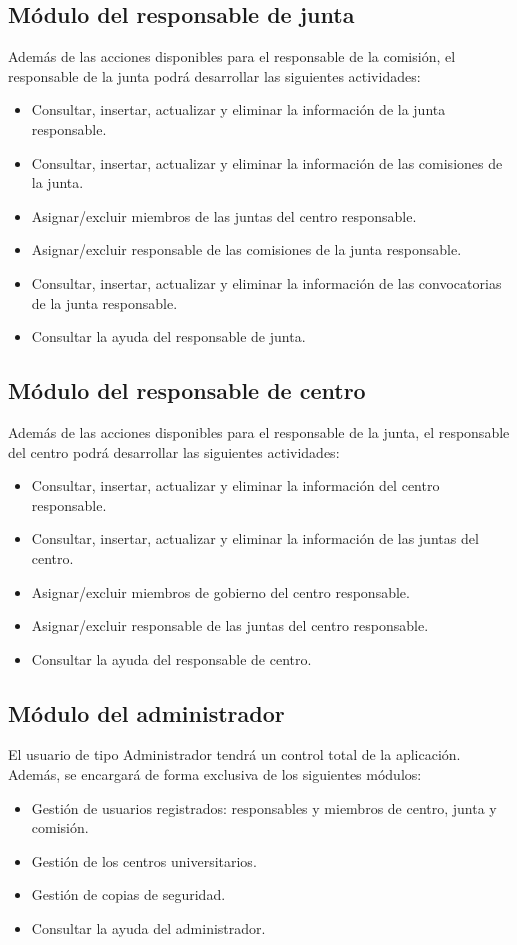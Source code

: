 \subsection{Módulo del responsable de junta}
Además de las acciones disponibles para el responsable de la comisión, el responsable de la junta podrá desarrollar las siguientes actividades:
\begin{itemize}
    \item Consultar, insertar, actualizar y eliminar la información de la junta responsable.
    \item Consultar, insertar, actualizar y eliminar la información de las comisiones de la junta.
    \item Asignar/excluir miembros de las juntas del centro responsable.
    \item Asignar/excluir responsable de las comisiones de la junta responsable.
    \item Consultar, insertar, actualizar y eliminar la información de las convocatorias de la junta responsable.
    \item Consultar la ayuda del responsable de junta.
\end{itemize}

\subsection{Módulo del responsable de centro}
Además de las acciones disponibles para el responsable de la junta, el responsable del centro podrá desarrollar las siguientes actividades:
\begin{itemize}
    \item Consultar, insertar, actualizar y eliminar la información del centro responsable.
    \item Consultar, insertar, actualizar y eliminar la información de las juntas del centro.
    \item Asignar/excluir miembros de gobierno del centro responsable.
    \item Asignar/excluir responsable de las juntas del centro responsable.
\item Consultar la ayuda del responsable de centro.
\end{itemize}

\subsection{Módulo del administrador}

El usuario de tipo Administrador tendrá un control total de la aplicación. Además, se encargará de forma exclusiva de los siguientes módulos:
\begin{itemize}
    \item Gestión de usuarios registrados: responsables y miembros de centro, junta y comisión.
    \item Gestión de los centros universitarios.
    \item Gestión de copias de seguridad.
    \item Consultar la ayuda del administrador.
\end{itemize}

